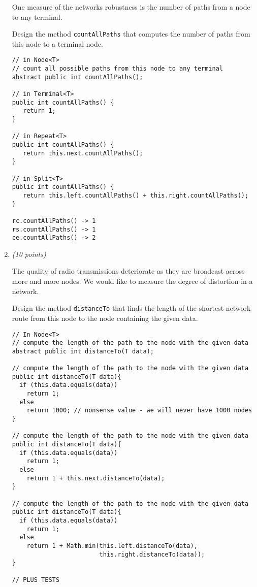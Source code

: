 \documentclass[11pt]{article}
\newcounter{Pctr}
\newenvironment{problem}{\stepcounter{Pctr}%
\begin{description}
\item[\noindent{\bf Problem} \arabic{Pctr}] 
\end{description}}{\relax}
\begin{document}
\begin{problem}
\begin{enumerate}
One measure of the networks robustness is the number of paths from 
a node to any terminal.

Design the method {\tt countAllPaths} that computes the number of
paths from this node to a terminal node.

\begsol{\vspace{0.5in}}
\begin{verbatim}
// in Node<T>
// count all possible paths from this node to any terminal
abstract public int countAllPaths();

// in Terminal<T>
public int countAllPaths() {
   return 1;
}

// in Repeat<T>
public int countAllPaths() {
   return this.next.countAllPaths();
}

// in Split<T>
public int countAllPaths() {
   return this.left.countAllPaths() + this.right.countAllPaths();
}

rc.countAllPaths() -> 1
rs.countAllPaths() -> 1
ce.countAllPaths() -> 2
\end{verbatim}
\endsol

\newpage
\item {\em{(10 points)}}

The quality of radio transmissions deteriorate as they are broadcast
across more and more nodes.  We would like to measure the degree of
distortion in a network.

Design the method {\tt distanceTo} that finds the length of the
shortest network route from this node to the node containing the given
data.

\begsol{\vspace{0.5in}}
\begin{verbatim}
// In Node<T>
// compute the length of the path to the node with the given data 
abstract public int distanceTo(T data);

// compute the length of the path to the node with the given data
public int distanceTo(T data){
  if (this.data.equals(data))
    return 1;
  else
    return 1000; // nonsense value - we will never have 1000 nodes
}

// compute the length of the path to the node with the given data
public int distanceTo(T data){
  if (this.data.equals(data))
    return 1;
  else
    return 1 + this.next.distanceTo(data);
}

// compute the length of the path to the node with the given data
public int distanceTo(T data){
  if (this.data.equals(data))
    return 1;
  else
    return 1 + Math.min(this.left.distanceTo(data), 
                        this.right.distanceTo(data));
}

// PLUS TESTS
\end{verbatim}
\endsol

\newpage
\end{enumerate}
\end{problem}
\end{document}
